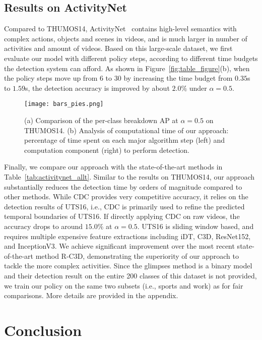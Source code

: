\documentclass{bmvc2k}
\begin{document}
\subsection{Results on ActivityNet}

Compared to THUMOS14, ActivityNet~\cite{caba2015activitynet} contains high-level semantics with complex actions, objects and scenes in videos, and is much larger in number of activities and amount of videos. Based on this large-scale dataset, we first evaluate our model with different policy steps, according to different time budgets the detection system can afford. As shown in Figure~\ref{fig:table_figure}(b), when the policy steps move up from 6 to 30 by increasing the time budget from $0.35$s to $1.59$s, the detection accuracy is improved by about $2.0\%$ under $\alpha = 0.5$.   

\begin{figure}[t]
	\centering
	\texttt{[image: bars\_pies.png]}
	\caption {(a) Comparison of the per-class breakdown AP at $\alpha = 0.5$ on THUMOS14. (b) Analysis of computational time of our approach: percentage of time spent on each major algorithm step (left) and computation component (right) to perform detection.}
	\label{fig:time}
\end{figure}

Finally, we compare our approach with the state-of-the-art methods in Table~\ref{tab:activitynet_allt}. Similar to the results on THUMOS14, our approach substantially reduces the detection time by orders of magnitude compared to other methods. While CDC provides very competitive accuracy, it relies on the detection results of UTS16, i.e., CDC is primarily used to refine the predicted temporal boundaries of UTS16. If directly applying CDC on raw videos, the accuracy drops to around $15.0\%$ at $\alpha = 0.5$. UTS16 is sliding window based, and requires multiple expensive feature extractions including iDT, C3D, ResNet152, and InceptionV3. We achieve significant improvement over the most recent state-of-the-art method R-C3D, demonstrating the superiority of our approach to tackle the more complex activities. Since the glimpses method \cite{yeung2015end} is a binary model and their detection result on the entire 200 classes of this dataset is not provided, we train our policy on the same two subsets (i.e., sports and work) as \cite{yeung2015end} for fair comparisons. More details are provided in the appendix. 
 
\section{Conclusion}
\end{document}
